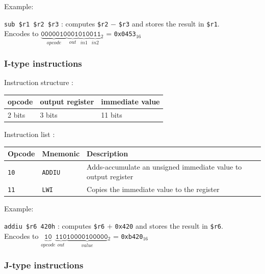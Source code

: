 \documentclass[a4paper]{report}
\begin{document}
Example:

\texttt{sub \$r1 \$r2 \$r3} : computes \texttt{\$r2} $-$ \texttt{\$r3} and stores the
result in \texttt{\$r1}. \\
Encodes to ${
	\underbrace{\texttt{0000010}}_{opcode}
	\underbrace{\texttt{001}}_{out}
	\underbrace{\texttt{010}}_{in 1}
	\underbrace{\texttt{011}}_{in 2}\mbox{}_2 %
}$ = \texttt{0x0453}$_{16}$

\subsubsection{I-type instructions}

Instruction structure :

\begin{center}
	\begin{tabular}{|l|l|l|}
		\hline
		opcode & output register & immediate value \\
		\hline
		2 bits & 3 bits & 11 bits \\
		\hline
	\end{tabular}
\end{center}

Instruction list :

\begin{center}
	\begin{tabular}{|l|l|l|}
		\hline
		Opcode & Mnemonic & Description \\
		\hline \hline
		\texttt{10} & \texttt{ADDIU} & Adds-accumulate an unsigned immediate
		                               value to output register \\
		\texttt{11} & \texttt{LWI} &   Copies the immediate value to
		                               the register \\
		\hline
	\end{tabular}
\end{center}

Example:

\texttt{addiu \$r6 420h} : computes \texttt{\$r6} $+$ \texttt{0x420} and stores
the result in \texttt{\$r6}. \\
Encodes to ${
	\underbrace{\texttt{10}}_{opcode}
	\underbrace{\texttt{110}}_{out}
	\underbrace{\texttt{10000100000}}_{value}\mbox{}_2
}$ = \texttt{0xb420}$_{16}$

\subsubsection{J-type instructions}
\end{document}
